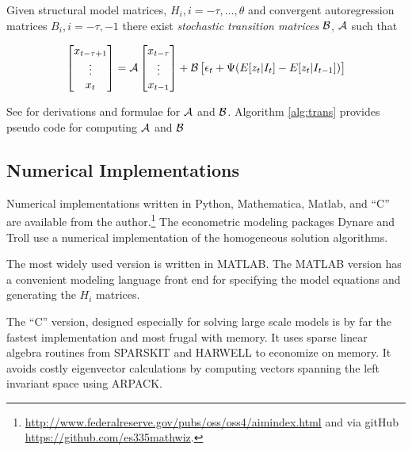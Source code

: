 \documentclass[12pt]{article}
\begin{document}
Given structural model matrices, $H_i, i=-\tau,\ldots,\theta$ 
and 
 convergent autoregression matrices $B_i,i=-\tau,-1$
there exist  
{\em stochastic transition
matrices\/} $\mathcal{B}$, $\mathcal{A}$ such that




  

\begin{gather}
\begin{bmatrix}
 x_{t-\tau+1}\\\vdots\\x_{t}
\end{bmatrix}= 
\sTransA%
\begin{bmatrix}
 x_{t-\tau}\\\vdots\\x_{t-1}
\end{bmatrix} +
\sTransB%
\begin{bmatrix}\epsilon_{t} +
\Psi  (E[z_t|I_t]-E[z_t|I_{t-1}])
\end{bmatrix}
\end{gather}


See \cite{anderson10} for  derivations and formulae for $\mathcal{A}$
and $\mathcal{B}$.
Algorithm \ref{alg:trans} provides pseudo code for computing $\mathcal{A}$ and $\mathcal{B}$




\subsection{Numerical Implementations}
\label{sec:imple}


Numerical implementations written in Python,  Mathematica,  Matlab,  and  ``C'' are available from the author.\footnote{\url{http://www.federalreserve.gov/pubs/oss/oss4/aimindex.html} and via gitHub \url{https://github.com/es335mathwiz}.}  The econometric modeling packages 
Dynare and  Troll use a numerical implementation of the homogeneous solution
algorithms.



The most widely used version is written in MATLAB. The MATLAB version
has a convenient modeling language front end for specifying the model
equations and generating the $H_i$ matrices. 

The ``C'' version, designed especially for solving large scale
models is by far the fastest implementation and most frugal with memory.
It uses sparse linear algebra routines from SPARSKIT\cite{saad94} and
HARWELL\cite{nag95} to economize on
memory. It avoids costly eigenvector calculations by
computing vectors spanning the left invariant space using ARPACK\cite{lehoucq96}.
\end{document}
